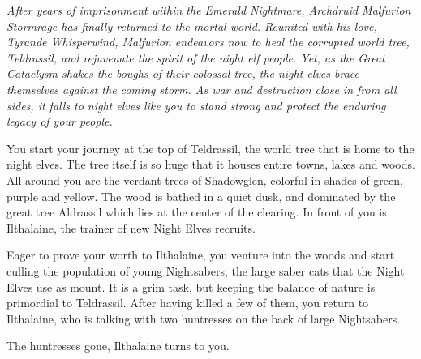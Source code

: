 \textit{After years of imprisonment within the Emerald Nightmare, Archdruid Malfurion Stormrage has finally returned to the mortal world. Reunited with his love, Tyrande Whisperwind, Malfurion endeavors now to heal the corrupted world tree, Teldrassil, and rejuvenate the spirit of the night elf people. Yet, as the Great Cataclysm shakes the boughs of their colossal tree, the night elves brace themselves against the coming storm. As war and destruction close in from all sides, it falls to night elves like you to stand strong and protect the enduring legacy of your people.}

You start your journey at the top of Teldrassil, the world tree that is home to the night elves. The tree itself is so huge that it houses entire towns, lakes and woods. All around you are the verdant trees of Shadowglen, colorful in shades of green, purple and yellow. The wood is bathed in a quiet dusk, and dominated by the great tree Aldrassil which lies at the center of the clearing. In front of you is Ilthalaine, the trainer of new Night Elves recruits.



Eager to prove your worth to Ilthalaine, you venture into the woods and start culling the population of young Nightsabers, the large saber cats that the Night Elves use as mount. It is a grim task, but keeping the balance of nature is primordial to Teldrassil. After having killed a few of them, you return to Ilthalaine, who is talking with two huntresses on the back of large Nightsabers.


The huntresses gone, Ilthalaine turns to you.


 


